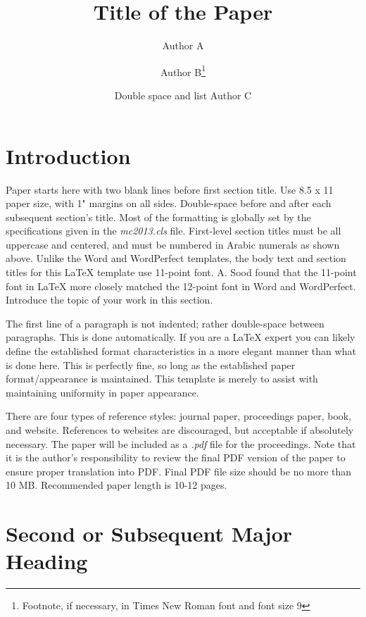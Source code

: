 \documentclass{ansjournal}
\title{Title of the Paper}
\author{Author A}
\author{Author B\footnote{Footnote, if necessary, in Times
  New Roman font and font size 9}}
\affil{Name of Institute \\
  Corresponding Address \\
  A@institute.gov; B@institute.gov}
\author{Double space and list Author C}
\affil{
  Department of Nuclear Engineering \\
  Name of University \\
  Address \\
  C@name.univ.edu
}
\begin{document}
\maketitle


\section{Introduction}

Paper starts here with two blank lines before first section title.  Use
8.5 x 11 paper size, with 1" margins on all sides.  Double-space before and
after each subsequent section's title.  Most of the formatting is globally
set by the specifications given in the {\it mc2013.cls} file.
First-level section titles must be all uppercase and centered, and must
be numbered in Arabic numerals as shown above.  Unlike the Word and WordPerfect
templates, the body text and section titles for this {\LaTeX} template use
11-point font.  A. Sood found that the 11-point font in {\LaTeX} more closely
matched the 12-point font in Word and WordPerfect.  Introduce the topic of
your work in this section.

The first line of a paragraph is not indented; rather double-space between
paragraphs.  This is done automatically. If you are a {\LaTeX} expert you
can likely define the established format characteristics in a more elegant
manner than what is done here.  This is perfectly fine, so long as the
established paper format/appearance is maintained.  This template is merely
to assist with maintaining uniformity in paper appearance.

There are four types of reference styles: journal paper\cite{journal},
proceedings paper\cite{proc_paper}, book\cite{book}, and website\cite{techrep}.
References to websites are discouraged, but acceptable if absolutely necessary.
The paper will be included as a {\it .pdf} file for the proceedings. Note that
it is the author's responsibility to review the final PDF version of the paper
to ensure proper translation into PDF.  Final PDF file size should be no more
than 10 MB. Recommended paper length is 10-12 pages.

\section{Second or Subsequent Major Heading}
\label{sec:first}
\end{document}
